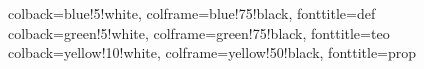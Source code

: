\usepackage[most]{tcolorbox}
\usepackage{amsmath, amsthm, amssymb}


%
{colback=blue!5!white, colframe=blue!75!black, fonttitle=\bfseries}{def}
%
{colback=green!5!white, colframe=green!75!black, fonttitle=\bfseries}{teo}
%
{colback=yellow!10!white, colframe=yellow!50!black, fonttitle=\bfseries}{prop}

\newcommand{\N}{\mathbb{N}}
\newcommand{\Z}{\mathbb{Z}}
\newcommand{\Q}{\mathbb{Q}}
\newcommand{\R}{\mathbb{R}}
\newcommand{\C}{\mathbb{C}}
